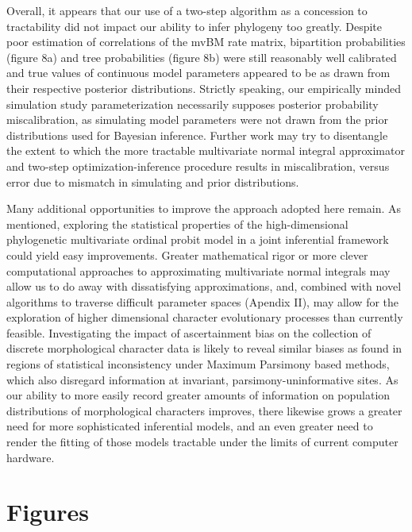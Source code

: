 \documentclass[12pt, twocolumn, twoside]{article}
\begin{document}
Overall, it appears that our use of a two-step algorithm as a concession to tractability did not impact our ability to infer phylogeny too greatly. Despite poor estimation of correlations of the mvBM rate matrix, bipartition probabilities (figure 8a) and tree probabilities (figure 8b) were still reasonably well calibrated and true values of continuous model parameters appeared to be as drawn from their respective posterior distributions. Strictly speaking, our empirically minded simulation study parameterization necessarily supposes posterior probability miscalibration, as simulating model parameters were not drawn from the prior distributions used for Bayesian inference. Further work may try to disentangle the extent to which the more tractable multivariate normal integral approximator and two-step optimization-inference procedure results in miscalibration, versus error due to mismatch in simulating and prior distributions. 

Many additional opportunities to improve the approach adopted here remain. As mentioned, exploring the statistical properties of the high-dimensional phylogenetic multivariate ordinal probit model in a joint inferential framework could yield easy improvements. Greater mathematical rigor or more clever computational approaches to approximating multivariate normal integrals may allow us to do away with dissatisfying approximations, and, combined with novel algorithms to traverse difficult parameter spaces (Apendix II), may allow for the exploration of higher dimensional character evolutionary processes than currently feasible. Investigating the impact of ascertainment bias on the collection of discrete morphological character data is likely to reveal similar biases as found in regions of statistical inconsistency under Maximum Parsimony based methods, which also disregard information at invariant, parsimony-uninformative sites. As our ability to more easily record greater amounts of information on population distributions of morphological characters improves, there likewise grows a greater need for more sophisticated inferential models, and an even greater need to render the fitting of those models tractable under the limits of current computer hardware.

\clearpage

\section*{Figures}
\end{document}
